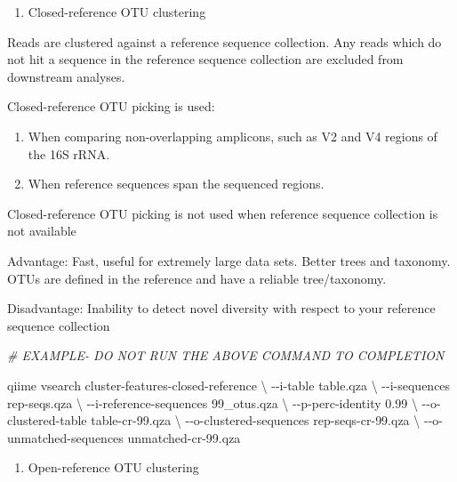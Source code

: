 \documentclass[
]{book}
\newenvironment{Shaded}{\begin{snugshade}}{\end{snugshade}}
\newcommand{\CommentTok}[1]{\textcolor[rgb]{0.56,0.35,0.01}{\textit{#1}}}
\newcommand{\DataTypeTok}[1]{\textcolor[rgb]{0.13,0.29,0.53}{#1}}
\newcommand{\ExtensionTok}[1]{#1}
\newcommand{\NormalTok}[1]{#1}
\providecommand{\tightlist}{%
  \setlength{\itemsep}{0pt}\setlength{\parskip}{0pt}}
\begin{document}
\begin{enumerate}
\def\labelenumi{\Roman{enumi}.}
\setcounter{enumi}{1}
\tightlist
\item
  Closed-reference OTU clustering
\end{enumerate}

Reads are clustered against a reference sequence collection. Any reads which do not hit a sequence in the reference sequence collection are excluded from downstream analyses.

Closed-reference OTU picking is used:

\begin{enumerate}
\def\labelenumi{\arabic{enumi}.}
\item
  When comparing non-overlapping amplicons, such as V2 and V4 regions of the 16S rRNA.
\item
  When reference sequences span the sequenced regions.
\end{enumerate}

Closed-reference OTU picking is not used when reference sequence collection is not available

Advantage: Fast, useful for extremely large data sets. Better trees and taxonomy. OTUs are defined in the reference and have a reliable tree/taxonomy.

Disadvantage: Inability to detect novel diversity with respect to your reference sequence collection

\begin{Shaded}
\begin{Highlighting}[]

\CommentTok{\# EXAMPLE{-} DO NOT RUN THE ABOVE COMMAND TO COMPLETION}

\ExtensionTok{qiime}\NormalTok{ vsearch cluster{-}features{-}closed{-}reference }\DataTypeTok{\textbackslash{}}
\NormalTok{{-}{-}i{-}table table.qza }\DataTypeTok{\textbackslash{}}
\NormalTok{{-}{-}i{-}sequences rep{-}seqs.qza }\DataTypeTok{\textbackslash{}}
\NormalTok{{-}{-}i{-}reference{-}sequences 99\_otus.qza }\DataTypeTok{\textbackslash{}}
\NormalTok{{-}{-}p{-}perc{-}identity 0.99 }\DataTypeTok{\textbackslash{}}
\NormalTok{{-}{-}o{-}clustered{-}table table{-}cr{-}99.qza }\DataTypeTok{\textbackslash{}}
\NormalTok{{-}{-}o{-}clustered{-}sequences rep{-}seqs{-}cr{-}99.qza }\DataTypeTok{\textbackslash{}}
\NormalTok{{-}{-}o{-}unmatched{-}sequences unmatched{-}cr{-}99.qza}
\end{Highlighting}
\end{Shaded}

\begin{enumerate}
\def\labelenumi{\Roman{enumi}.}
\setcounter{enumi}{2}
\tightlist
\item
  Open-reference OTU clustering
\end{enumerate}
\end{document}
